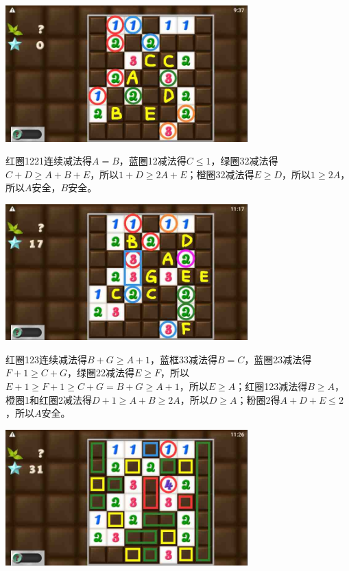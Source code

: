 \subsection{} %
\begin{center}
    \includegraphics[width=0.7\textwidth]{puzzlelow/248-1.jpg}
\end{center}
红圈1221连续减法得$A=B$，蓝圈12减法得$C\le 1$，绿圈32减法得$C+D\ge A+B+E$，所以$1+D\ge 2A+E$；橙圈32减法得$E\ge D$，所以$1\ge 2A$，所以$A$安全，$B$安全。
\begin{center}
    \includegraphics[width=0.7\textwidth]{puzzlelow/248-2.jpg}
\end{center}
红圈123连续减法得$B+G\ge A+1$，蓝框33减法得$B=C$，蓝圈23减法得$F+1\ge C+G$，绿圈22减法得$E\ge F$，所以$E+1\ge F+1\ge C+G=B+G\ge A+1$，所以$E\ge A$；红圈123减法得$B\ge A$，橙圈1和红圈2减法得$D+1\ge A+B\ge 2A$，所以$D\ge A$；粉圈2得$A+D+E\le 2$，所以$A$安全。
\begin{center}
    \includegraphics[width=0.7\textwidth]{puzzlelow/248-3.jpg}
\end{center}
